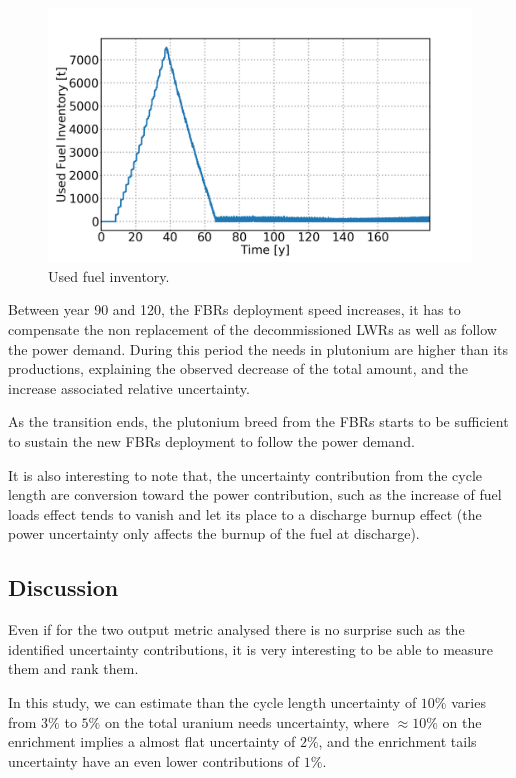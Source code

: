 \documentclass{anstrans}
\begin{document}
\begin{figure}[ht] %
    \centering
    \includegraphics[scale=0.18]{used_fuel}
    \caption{Used fuel inventory.}\label{fig:used_fuel}
\end{figure}
Between year 90 and 120, the \glspl{FBR} deployment speed increases, it has to
compensate the non replacement of the decommissioned \glspl{LWR} as well as
follow the power demand. During this period the needs in plutonium are higher
than its productions, explaining the observed decrease of the total amount, and
the increase associated relative uncertainty.

As the transition ends, the plutonium breed from the \glspl{FBR} starts to be
sufficient to sustain the new \glspl{FBR} deployment to follow the power demand.

It is also interesting to note that, the uncertainty contribution from the cycle
length are conversion toward the power contribution, such as the increase of
fuel loads effect tends to vanish and let its place to a discharge burnup
effect (the power uncertainty only affects the burnup of the fuel at discharge).

\subsection{Discussion}

Even if for the two output metric analysed there is no surprise such as the
identified uncertainty contributions, it is very interesting to be able to
measure them and rank them.

In this study, we can estimate than the cycle length uncertainty of $10\%$
varies from $3\%$ to $5\%$ on the total uranium needs uncertainty, where $\approx10\%$
on the enrichment implies a almost flat uncertainty of $2\%$, and the enrichment
tails uncertainty have an even lower contributions of $1\%$.
\end{document}
